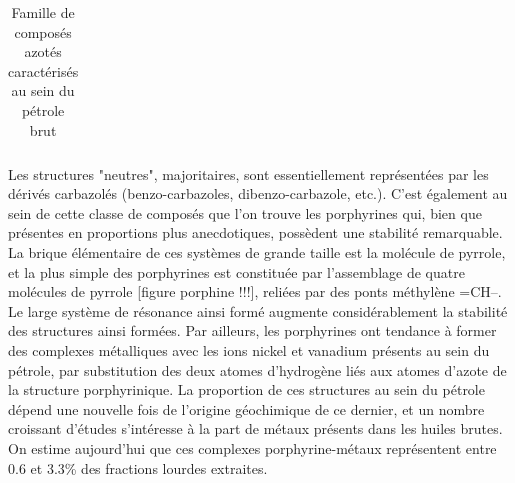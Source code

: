 \begin{table}[h!]
\begin{center}
\begin{tabular}{rl}
			\hline 
		\end{tabular}
	\end{center}
	\caption{Famille de composés azotés caractérisés au sein du pétrole brut}
	\label{tab:azote}
\end{table}


Les structures "neutres", majoritaires, sont essentiellement représentées par les dérivés carbazolés (benzo-carbazoles, dibenzo-carbazole, etc.). C'est également au sein de cette classe de composés que l'on trouve les porphyrines qui, bien que présentes en proportions plus anecdotiques, possèdent une stabilité remarquable. La brique élémentaire de ces systèmes de grande taille est la molécule de pyrrole, et la plus simple des porphyrines est constituée par l'assemblage de quatre molécules de pyrrole [figure porphine !!!], reliées par des ponts méthylène =CH--. Le large système de résonance ainsi formé augmente considérablement la stabilité des structures ainsi formées. Par ailleurs, les porphyrines ont tendance à former des complexes métalliques avec les ions nickel et vanadium présents au sein du pétrole, par substitution des deux atomes d'hydrogène liés aux atomes d'azote de la structure porphyrinique. La proportion de ces structures au sein du pétrole dépend une nouvelle fois de l'origine géochimique de ce dernier, et un nombre croissant d'études s'intéresse à la part de métaux présents dans les huiles brutes. On estime aujourd'hui que ces complexes porphyrine-métaux représentent entre 0.6 et 3.3\% des fractions lourdes extraites\cite{merdrignac2007physicochemical, speight2004petroleum}.

